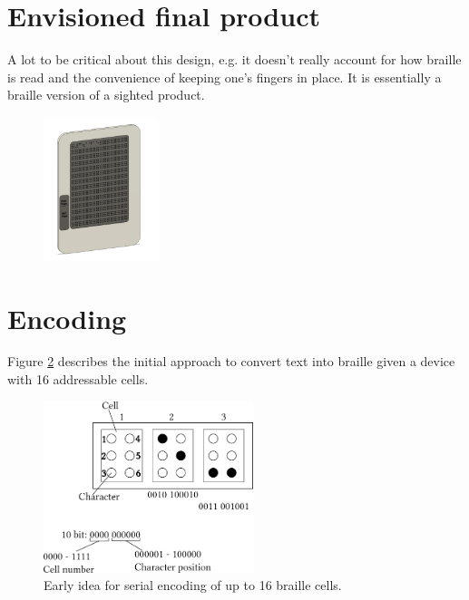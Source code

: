 \section{Envisioned final product}
A lot to be critical about this design, e.g. it doesn't really account for how braille is read and the convenience of keeping one's fingers in place. It is essentially a braille version of a sighted product.
\begin{figure}[h]
\centering
    \includegraphics[width=0.3\textwidth]{figures/e-reader.png}
\caption{}
\label{fig:e-reader.png}
\end{figure}
\section{Encoding}
Figure \ref{fig:encoding.png} describes the initial approach to convert text into braille given a device with 16 addressable cells.
\begin{figure}[h]
\centering
    \includegraphics[height=5cm]{figures/encoding.png}
\caption{Early idea for serial encoding of up to 16 braille cells.}
\label{fig:encoding.png}
\end{figure}

